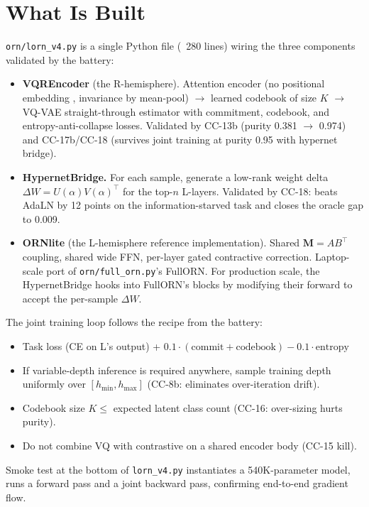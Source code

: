 \documentclass[10pt, twocolumn, a4paper]{article}
\newcommand{\M}{\mathbf{M}}
\begin{document}
\section{What Is Built}

\texttt{orn/lorn\_v4.py} is a single Python file (~280 lines) wiring the three components validated by the battery:

\begin{itemize}[nosep,leftmargin=*]
\item \textbf{VQREncoder} (the R-hemisphere). Attention encoder (no positional embedding ,  invariance by mean-pool) $\to$ learned codebook of size $K$ $\to$ VQ-VAE straight-through estimator with commitment, codebook, and entropy-anti-collapse losses. Validated by CC-13b (purity 0.381 $\to$ 0.974) and CC-17b/CC-18 (survives joint training at purity 0.95 with hypernet bridge).
\item \textbf{HypernetBridge.} For each sample, generate a low-rank weight delta $\Delta W = U(\alpha) V(\alpha)^\top$ for the top-$n$ L-layers. Validated by CC-18: beats AdaLN by 12 points on the information-starved task and closes the oracle gap to 0.009.
\item \textbf{ORNlite} (the L-hemisphere reference implementation). Shared $\M = AB^\top$ coupling, shared wide FFN, per-layer gated contractive correction. Laptop-scale port of \texttt{orn/full\_orn.py}'s FullORN. For production scale, the HypernetBridge hooks into FullORN's blocks by modifying their forward to accept the per-sample $\Delta W$.
\end{itemize}

The joint training loop follows the recipe from the battery:
\begin{itemize}[nosep]
\item Task loss (CE on L's output) + $0.1 \cdot (\text{commit} + \text{codebook}) - 0.1 \cdot \text{entropy}$
\item If variable-depth inference is required anywhere, sample training depth uniformly over $[h_{\min}, h_{\max}]$ (CC-8b: eliminates over-iteration drift).
\item Codebook size $K \le$ expected latent class count (CC-16: over-sizing hurts purity).
\item Do not combine VQ with contrastive on a shared encoder body (CC-15 kill).
\end{itemize}

Smoke test at the bottom of \texttt{lorn\_v4.py} instantiates a 540K-parameter model, runs a forward pass and a joint backward pass, confirming end-to-end gradient flow.
\end{document}
